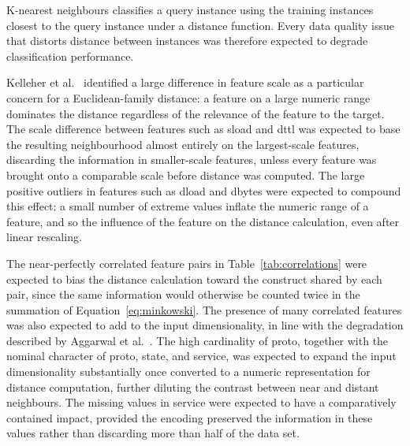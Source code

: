 \documentclass[10pt,conference]{IEEEtran}
\begin{document}
K-nearest neighbours classifies a query instance using the training instances closest to the query instance under a distance function. Every data quality issue that distorts distance between instances was therefore expected to degrade classification performance.

Kelleher et al.~\cite{kelleher2020} identified a large difference in feature scale as a particular concern for a Euclidean-family distance: a feature on a large numeric range dominates the distance regardless of the relevance of the feature to the target. The scale difference between features such as sload and dttl was expected to base the resulting neighbourhood almost entirely on the largest-scale features, discarding the information in smaller-scale features, unless every feature was brought onto a comparable scale before distance was computed. The large positive outliers in features such as dload and dbytes were expected to compound this effect: a small number of extreme values inflate the numeric range of a feature, and so the influence of the feature on the distance calculation, even after linear rescaling.

The near-perfectly correlated feature pairs in Table~\ref{tab:correlations} were expected to bias the distance calculation toward the construct shared by each pair, since the same information would otherwise be counted twice in the summation of Equation~\eqref{eq:minkowski}. The presence of many correlated features was also expected to add to the input dimensionality, in line with the degradation described by Aggarwal et al.~\cite{aggarwal2001}. The high cardinality of proto, together with the nominal character of proto, state, and service, was expected to expand the input dimensionality substantially once converted to a numeric representation for distance computation, further diluting the contrast between near and distant neighbours. The missing values in service were expected to have a comparatively contained impact, provided the encoding preserved the information in these values rather than discarding more than half of the data set.
\end{document}
